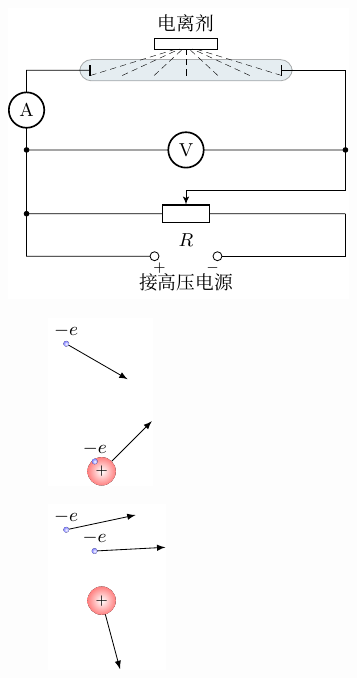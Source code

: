\begin{figure}[htbp]
    \centering
    \begin{minipage}[b]{0.48\textwidth}
        \centering
        \includegraphics{fig/B/8-5.pdf}
        \caption{}\label{fig_B_8-5}
    \end{minipage}
    \begin{minipage}[b]{0.48\textwidth}
        \centering
        \begin{subfigure}{0.45\linewidth}
            \centering
            \includegraphics{fig/B/8-6a.pdf}
            \caption{}\label{fig_B_8-6a}
        \end{subfigure}
        \hfil
        \begin{subfigure}{0.45\linewidth}
            \centering
            \includegraphics{fig/B/8-6b.pdf}
            \caption{}\label{fig_B_8-6b}
        \end{subfigure}
        \caption{}\label{fig_B_8-6}
    \end{minipage}
\end{figure}

